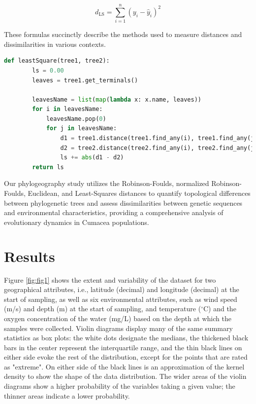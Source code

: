 \begin{equation}\label{eq:ls}
    d_{\text{LS}} = \sum_{i=1}^{n} (y_i - \hat{y}_i)^2
\end{equation}

These formulas succinctly describe the methods used to measure distances and dissimilarities in various contexts.

\begin{lstlisting}[label=lst:LeastSquare,language=Python,caption=Python script for calculating the Least-Square distance using the ete3 package in the aPhyloGeo package]
    def leastSquare(tree1, tree2):
        ls = 0.00
        leaves = tree1.get_terminals()

        leavesName = list(map(lambda x: x.name, leaves))
        for i in leavesName:
            leavesName.pop(0)
            for j in leavesName:
                d1 = tree1.distance(tree1.find_any(i), tree1.find_any(j))
                d2 = tree2.distance(tree2.find_any(i), tree2.find_any(j))
                ls += abs(d1 - d2)
        return ls
\end{lstlisting}

Our phylogeography study utilizes the Robinson-Foulds, normalized Robinson-Foulds, Euclidean, and Least-Squares distances to quantify topological differences between phylogenetic trees and assess dissimilarities between genetic sequences and environmental characteristics, providing a comprehensive analysis of evolutionary dynamics in Cumacea populations.

\section{Results}\label{results}

Figure \ref{fig:fig1} shows the extent and variability of the dataset for two geographical attributes, i.e., latitude (decimal) and longitude (decimal) at the start of sampling, as well as six environmental attributes, such as wind speed (m/s) and depth (m) at the start of sampling, and temperature ($^\circ$C) and the oxygen concentration of the water (mg/L) based on the depth at which the samples were collected. Violin diagrams display many of the same summary statistics as box plots: the white dots designate the medians, the thickened black bars in the center represent the interquartile range, and the thin black lines on either side evoke the rest of the distribution, except for the points that are rated as "extreme". On either side of the black lines is an approximation of the kernel density to show the shape of the data distribution. The wider areas of the violin diagrams show a higher probability of the variables taking a given value; the thinner areas indicate a lower probability.


